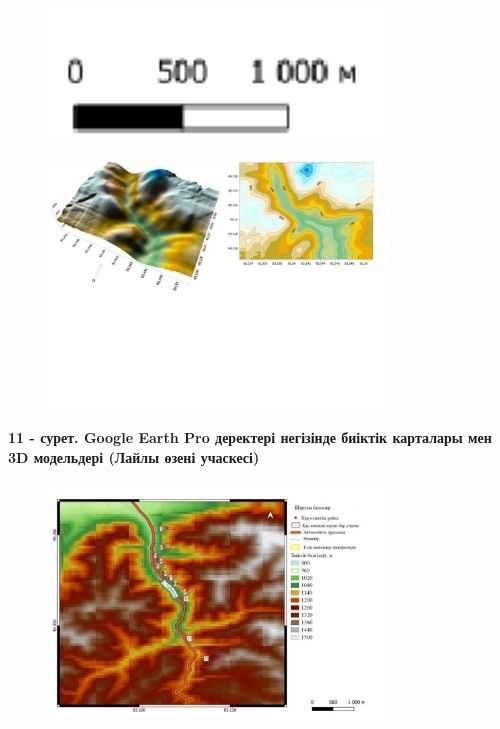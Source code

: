 \begin{figure}[H]
	\centering
	\includegraphics[width=0.8\textwidth]{media/ict2/image209}
	\caption*{}
\end{figure}

\begin{figure}[H]
	\centering
	\includegraphics[width=0.8\textwidth]{media/ict2/image214}
	\caption*{}
\end{figure}


{\bfseries 11 - сурет. Google Earth Pro деректері негізінде биіктік
карталары мен 3D модельдері (Лайлы өзені учаскесі)}


\begin{figure}[H]
	\centering
	\includegraphics[width=0.8\textwidth]{media/ict2/image215}
	\caption*{}
\end{figure}


